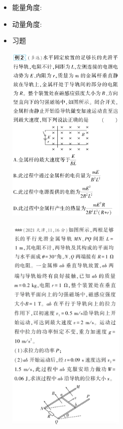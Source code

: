 \documentclass{article}
\begin{document}
\begin{itemize}
    \item 能量角度:
          \vspace{5em}
    \item 动量角度:
          \vspace{5em}
    \item 习题

          \centering
          \includegraphics[width = 0.45\textwidth]{./pictures/10.png}

          \vspace{2em}

          \centering
          \includegraphics[width = 0.45\textwidth]{./pictures/19.png}


\end{itemize}
\end{document}
